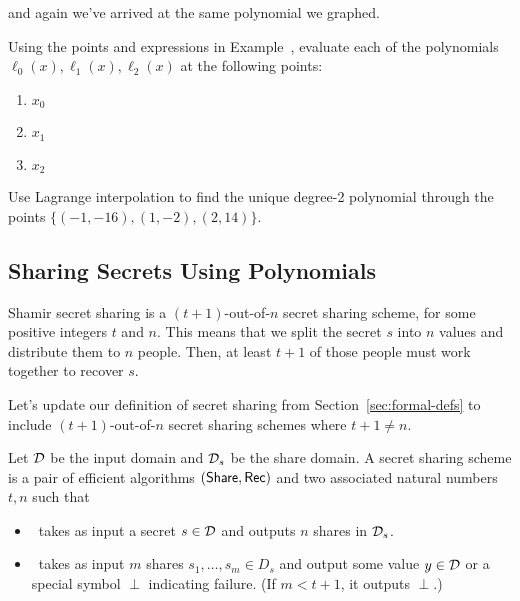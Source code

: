 \begin{example}
and again we've arrived at the same polynomial we graphed.
\end{example}

\begin{bonus}
    Using the points and expressions in Example~,
    evaluate each of the polynomials $\ell_0(x), \ell_1(x), \ell_2(x)$ at the following points:
    \renewcommand{\labelenumi}{(\alph{enumi})} 
    \begin{enumerate}
        \item $x_0$
        \item $x_1$
        \item $x_2$
    \end{enumerate}
\end{bonus}

\begin{bonus}
    Use Lagrange interpolation to find the unique degree-2 
    polynomial through the points $\{(-1,-16),(1,-2),(2,14)\}$.
\end{bonus}

\subsection{Sharing Secrets Using Polynomials}

Shamir secret sharing is a $(t+1)$-out-of-$n$ secret sharing scheme, for some positive integers $t$ and $n$. This means that we split the secret $s$ into $n$ values and distribute them to $n$ people. Then, at least $t+1$ of those people must work together to recover $s$.

Let's update our definition of secret sharing from Section~\ref{sec:formal-defs}
to include $(t+1)$-out-of-$n$ secret sharing schemes where $t+1 \neq n$.

\begin{definition}\label{def:ss-update}
    Let $\mathcal{D}$ be the input domain and $\mathcal{D}_s$ be the share domain.
    A secret sharing scheme is a pair of efficient algorithms $(\mathsf{Share}, \mathsf{Rec})$
    and two associated natural numbers $t,n$ such that

    \begin{itemize}
        \item \share~takes as input a secret $s \in \mathcal{D}$ and outputs $n$ 
        shares in $\mathcal{D}_s$.
        \item \rec~takes as input $m$ shares $s_1, \ldots, s_m \in D_s$ 
        and output some value $y \in \mathcal{D}$ or a special symbol $\perp$ 
        indicating failure. (If $m < t+1$, it outputs $\perp$.)
    \end{itemize}
\end{definition}

